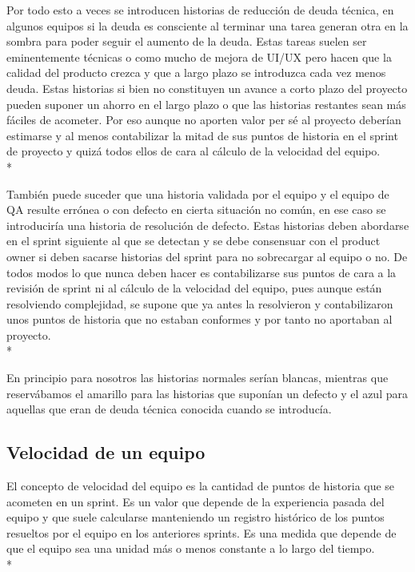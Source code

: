 \documentclass[../pfc.tex]{subfiles}
\begin{document}
	Por todo esto a veces se introducen historias de reducción de deuda técnica, en algunos equipos si la deuda es consciente al terminar una tarea generan otra en la sombra para poder seguir el aumento de la deuda. Estas tareas suelen ser eminentemente técnicas o como mucho de mejora de UI/UX pero hacen que la calidad del producto crezca y que a largo plazo se introduzca cada vez menos deuda. Estas historias si bien no constituyen un avance a corto plazo del proyecto pueden suponer un ahorro en el largo plazo o que las historias restantes sean más fáciles de acometer. Por eso aunque no aporten valor per sé al proyecto deberían estimarse y al menos contabilizar la mitad de sus puntos de historia en el sprint de proyecto y quizá todos ellos de cara al cálculo de la velocidad del equipo.\\*
	
	También puede suceder que una historia validada por el equipo y el equipo de QA resulte errónea o con defecto en cierta situación no común, en ese caso se introduciría una historia de resolución de defecto. Estas historias deben abordarse en el sprint siguiente al que se detectan y se debe consensuar con el product owner si deben sacarse historias del sprint para no sobrecargar al equipo o no. De todos modos lo que nunca deben hacer es contabilizarse sus puntos de cara a la revisión de sprint ni al cálculo de la velocidad del equipo, pues aunque están resolviendo complejidad, se supone que ya antes la resolvieron y contabilizaron unos puntos de historia que no estaban conformes y por tanto no aportaban al proyecto. \\*
	
	En principio para nosotros las historias normales serían blancas, mientras que reservábamos el amarillo para las historias que suponían un defecto y el azul para aquellas que eran de deuda técnica conocida cuando se introducía. 
		
	\subsection{Velocidad de un equipo}
	
	El concepto de velocidad del equipo es la cantidad de puntos de historia que se acometen en un sprint. Es un valor que depende de la experiencia pasada del equipo y que suele calcularse manteniendo un registro histórico de los puntos resueltos por el equipo en los anteriores sprints. Es una medida que depende de que el equipo sea una unidad más o menos constante a lo largo del tiempo.\\*
	
\end{document}
